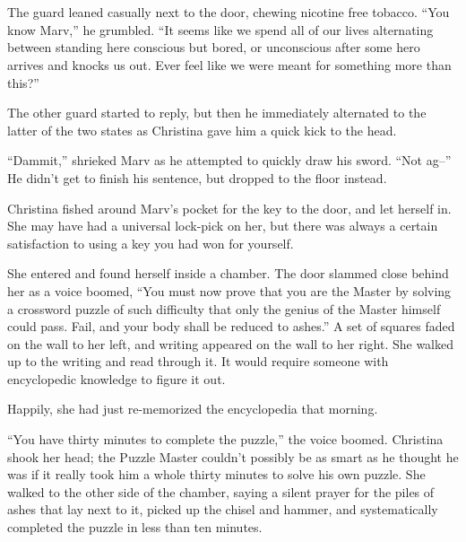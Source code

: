\documentclass[showtrims,b6paper,draft,10pt]{memoir}
\begin{document}
\newcommand{\timeskip}{\begin{center}* * *\end{center}}

\chapter{}

The guard leaned casually next to the door, chewing nicotine free tobacco.  “You know Marv,” he grumbled.  “It seems like we spend all of our lives alternating between standing here conscious but bored, or unconscious after some hero arrives and knocks us out.  Ever feel like we were meant for something more than this?”

The other guard started to reply, but then he immediately alternated to the latter of the two states as Christina gave him a quick kick to the head.

``Dammit,'' shrieked Marv as he attempted to quickly draw his sword.  ``Not ag--''  He didn’t get to finish his sentence, but dropped to the floor instead.

Christina fished around Marv’s pocket for the key to the door, and let herself in.  She may have had a universal lock-pick on her, but there was always a certain satisfaction to using a key you had won for yourself.

She entered and found herself inside a chamber.  The door slammed close behind her as a voice boomed, ``You must now prove that you are the Master by solving a crossword puzzle of such difficulty that only the genius of the Master himself could pass.  Fail, and your body shall be reduced to ashes.''  A set of squares faded on the wall to her left, and writing appeared on the wall to her right.  She walked up to the writing and read through it.  It would require someone with encyclopedic knowledge to figure it out.

Happily, she had just re-memorized the encyclopedia that morning.

``You have thirty minutes to complete the puzzle,'' the voice boomed.  Christina shook her head;  the Puzzle Master couldn’t possibly be as smart as he thought he was if it really took him a whole thirty minutes to solve his own puzzle.  She walked to the other side of the chamber, saying a silent prayer for the piles of ashes that lay next to it, picked up the chisel and hammer, and systematically completed the puzzle in less than ten minutes.
\end{document}
